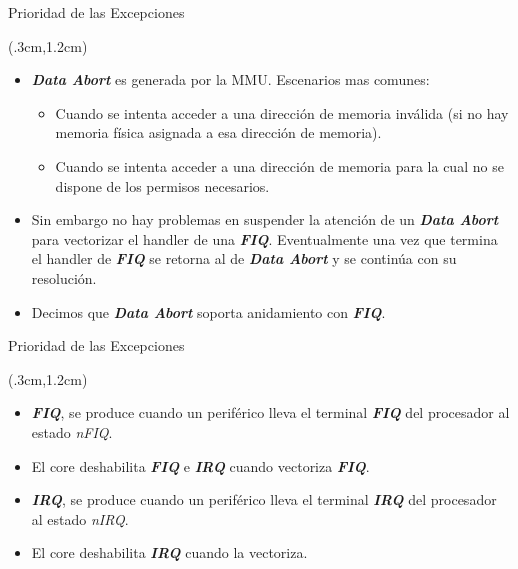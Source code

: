 \documentclass[table,x11names,aspectratio=169]{beamer}
\begin{document}
\begin{frame}{Prioridad de las Excepciones}
 \begin{textblock*}{\textwidth}(.3cm,1.2cm)
  \begin{itemize}[<+->]\justifying \parskip 0.3cm
   \item \textbf{\textit{Data Abort}} es generada por la MMU. Escenarios mas comunes:
   \begin{itemize} \justifying \parskip 0.3cm
    \item Cuando se intenta acceder a una dirección de memoria inválida (si no hay memoria física asignada a esa dirección de memoria).
    \item Cuando se intenta acceder a una dirección de memoria para la cual no se dispone de los permisos necesarios.
   \end{itemize}
   \item Sin embargo no hay problemas en suspender la atención de un \textbf{\textit{Data Abort}} para vectorizar el handler de una \textit{\textbf{FIQ}}. Eventualmente una vez que termina el handler de \textbf{\textit{FIQ}} se retorna al de \textbf{\textit{Data Abort}} y se continúa con su resolución.
   \item Decimos que \textbf{\textit{Data Abort}} soporta anidamiento con \textit{\textbf{FIQ}}.
  \end{itemize}
 \end{textblock*}
\end{frame}

\begin{frame}{Prioridad de las Excepciones}
 \begin{textblock*}{\textwidth}(.3cm,1.2cm)
  \begin{itemize}[<+->] \justifying \parskip 0.3cm
   \item \textbf{\textit{FIQ}}, se produce cuando un periférico lleva el terminal \textit{\textbf{FIQ}} del procesador al estado \textit{nFIQ}.
   \item El core deshabilita \textbf{\textit{FIQ}} e \textit{\textbf{IRQ}} cuando vectoriza \textbf{\textit{FIQ}}.
   \item \textbf{\textit{IRQ}}, se produce cuando un periférico lleva el terminal \textit{\textbf{IRQ}} del procesador al estado \textit{nIRQ}.
   \item El core deshabilita \textit{\textbf{IRQ}} cuando la vectoriza.
  \end{itemize}
 \end{textblock*}
\end{frame}
\end{document}
